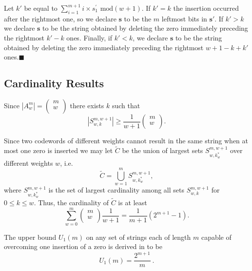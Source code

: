 \documentclass[12pt]{article} \pagestyle{plain} \topmargin
\begin{document}
Let $k'$ be equal to $\sum_{i=1}^{m+1} i \times s_1^{'} \text{ mod
} (w+1)$. If $k'=k$ the insertion occurred after the rightmost
one, so we declare $\mathbf{s}$ to be the $m$ leftmost bits in
$\mathbf{s'}$. If $k'>k$ we declare $\mathbf{s}$ to be the string
obtained by deleting the zero immediately preceding the rightmost
$k'-k$ ones.  Finally, if $k'< k$, we declare $\mathbf{s}$ to be
the string obtained by deleting the zero immediately preceding the
rightmost $w+1-k+k'$ ones.\hfill$\blacksquare$

\subsection{Cardinality Results}
\vspace{0.2in} Since $|A_w^m| = \left( \begin{array}{c}
                             m \\
                             w \\
                           \end{array}
                           \right)$ there exists $k$ such that
                           \[|S_{w,k}^{m,w+1} | \geq \frac{1}{w+1}
\left( \begin{array}{c}
                             m \\
                             w \\
                           \end{array}
                           \right).\]

Since two codewords of different weights cannot result in the same
string when at most one zero is inserted we may let $\tilde{C}$ be
the union of largest sets $S_{w,k^*_w}^{m,w+1}$ over different
weights $w$, i.e. \[\tilde{C}=\bigcup_{w=1}^{m}
S_{w,k^*_w}^{m,w+1},\] where $S_{w,k^*_w}^{m,w+1}$ is the set of
largest cardinality among all sets $S_{w,k}^{m,w+1}$ for $0\leq
k\leq w$. Thus, the cardinality of $\tilde{C}$ is at least
\[\sum_{w=0}^m \left(
\begin{array}{c}
                             m \\
                             w \\
                           \end{array}
                           \right) \frac{1}{w+1}=\frac{1}{m+1}
                           \left(2^{m+1}-1\right).\]

The upper bound $U_1(m)$ on any set of strings each of length $m$
capable of overcoming one insertion of a zero is derived in
\cite{lev:66a} to be
\begin{equation}\label{ub0}U_1(m)=\frac{2^{m+1}}{m}~.\end{equation}
\end{document}
